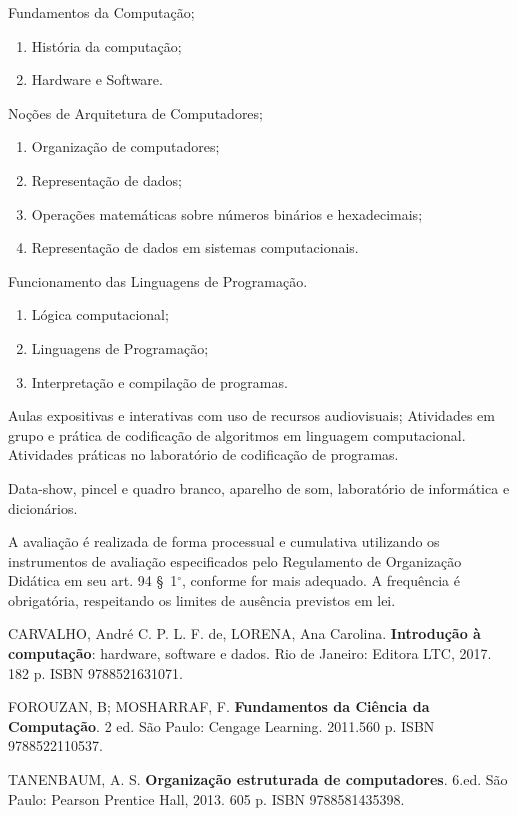 \begin{pud}
\begin{description}[itemsep=0em]
	   \item[UNIDADE II:] Fundamentos da Computação;
	   \begin{enumerate}[itemsep=0em, topsep=0em]
	     \item História da computação;
	     \item Hardware e Software.
	   \end{enumerate}
	   
	    \item[UNIDADE III:]  Noções de Arquitetura de Computadores;
	   \begin{enumerate}[itemsep=0em, topsep=0em]
	     \item Organização de computadores;
	     \item Representação de dados;
	     \item Operações matemáticas sobre números binários e hexadecimais;
	     \item Representação de dados em sistemas computacionais.
	   \end{enumerate}
	   
	   	    
	    \item[UNIDADE IV:] Funcionamento das Linguagens de Programação.
	    \begin{enumerate}[itemsep=0em, topsep=0em]
	     \item Lógica computacional;
	     \item Linguagens de Programação;
	     \item Interpretação e compilação de programas.
	   \end{enumerate}
	   
	\end{description}
	
	
	\metodologia            	
       Aulas expositivas e interativas com uso de recursos audiovisuais;
       Atividades em grupo e prática de codificação de algoritmos em linguagem computacional.
       Atividades práticas no laboratório de codificação de programas.
	
	\recursos
	Data-show, pincel e quadro branco, aparelho de som, laboratório de informática e
dicionários.
	
	\avaliacao	
	A avaliação é realizada de forma processual e cumulativa utilizando os instrumentos de avaliação especificados pelo Regulamento de Organização Didática em seu art. 94 \S~1$^\circ$, conforme for mais adequado. A frequência é obrigatória, respeitando os limites de ausência previstos em lei.
	
	\begin{bibbasica}
		\item CARVALHO, André C. P. L. F. de, LORENA, Ana Carolina. \textbf{Introdução à
computação}: hardware, software e dados. Rio de Janeiro: Editora LTC, 2017. 182
p. ISBN 9788521631071.
		\item FOROUZAN, B; MOSHARRAF, F. \textbf{Fundamentos da Ciência da Computação}. 2
ed. São Paulo: Cengage Learning. 2011.560 p. ISBN 9788522110537.
		\item TANENBAUM, A. S. \textbf{Organização estruturada de computadores}. 6.ed. São
Paulo: Pearson Prentice Hall, 2013. 605 p. ISBN 9788581435398.
	 	 

\end{bibbasica}
\end{pud}
